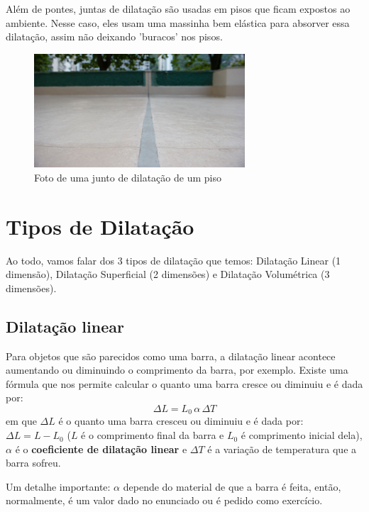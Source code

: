 \documentclass[12pt]{extarticle}
\newcommand{\<}{\langle}
\renewcommand{\>}{\rangle}
\theoremstyle{definition}
\begin{document}
Além de pontes, juntas de dilatação são usadas em pisos que ficam expostos ao ambiente. Nesse caso, eles usam uma massinha bem elástica para absorver essa dilatação, assim não deixando 'buracos' nos pisos.

\begin{figure}[H]
    \centering
    \includegraphics[width=0.7\textwidth]{xjuntas-de-dilatacao.jpg.pagespeed.ic.2LQSZrGsDX.jpg}
    \caption{Foto de uma junto de dilatação de um piso}
    \label{fig:ex_2}
\end{figure}

\section{Tipos de Dilatação}

Ao todo, vamos falar dos 3 tipos de dilatação que temos: Dilatação Linear (1 dimensão), Dilatação Superficial (2 dimensões) e Dilatação Volumétrica (3 dimensões).

\subsection{Dilatação linear}

Para objetos que são parecidos como uma barra, a dilatação linear acontece aumentando ou diminuindo o comprimento da barra, por exemplo. Existe uma fórmula que nos permite calcular o quanto uma barra cresce ou diminuiu e é dada por:
\begin{equation}
    \Delta L = L_0\, \alpha\, \Delta T
\end{equation}
\noindent em que $\Delta L$ é o quanto uma barra cresceu ou diminuiu e é dada por: $\Delta L = L - L_0$ ($L$ é o comprimento final da barra e $L_0$ é comprimento inicial dela), $\alpha$ é o \textbf{coeficiente de dilatação linear} e $\Delta T$ é a variação de temperatura que a barra sofreu.

Um detalhe importante: $\alpha$ depende do material de que a barra é feita, então, normalmente, é um valor dado no enunciado ou é pedido como exercício. 
\end{document}
